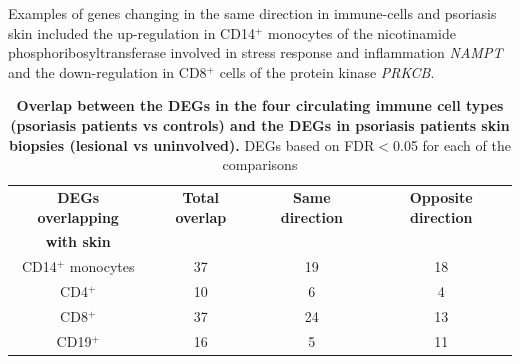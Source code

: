 Examples of genes changing in the same direction in immune-cells and psoriasis skin included the up-regulation in CD14$^+$ monocytes of the nicotinamide phosphoribosyltransferase involved in stress response and inflammation \textit{NAMPT} \parencite{Presumey2013} and the down-regulation in CD8$^+$ cells of the protein kinase \textit{PRKCB}.
 

\begin{table}[htbp]
\centering
\begin{tabular}{@{} c c c c}
\toprule
\textbf{DEGs overlapping}   & \textbf{Total overlap}   & \textbf{Same direction}  & \textbf{Opposite direction}\\
\textbf{with skin}          &                          &                          &                            \\
\midrule 
\midrule
CD14$^+$ monocytes          & 37                       & 19                       &  18                         \\ 
CD4$^+$                     & 10                       & 6                        &  4                           \\
CD8$^+$                     & 37                       & 24                       &  13                           \\
CD19$^+$                    & 16                       & 5                        &  11                          \\
\bottomrule 
\end{tabular}
\medskip %
\caption[Overlap between the DEGs in the four circulating immune cell types (psoriasis patients vs controls) and the DEGs in psoriasis patients skin biopsies (lesional vs uninvolved).]{\textbf{Overlap between the DEGs in the four circulating immune cell types (psoriasis patients vs controls) and the DEGs in psoriasis patients skin biopsies (lesional vs uninvolved).} DEGs based on FDR$<$0.05 for each of the comparisons} 
\label{tab:RNAseq_overlap_circulating_versus_skin}
\end{table}
\bigskip %


